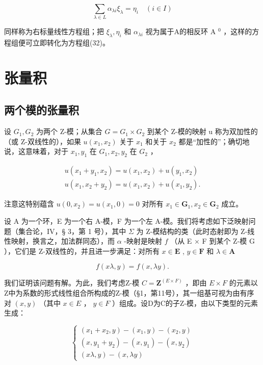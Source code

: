\[
\sum_ {\lambda \in L} \alpha_ {\lambda i} \xi_ {\lambda} = \eta_ {i} \quad (i \in I)\tag{33}
\]

同样称为右标量线性方程组；把 \(\xi_{\lambda}, \eta_{i}\) 和 \(\alpha_{\lambda i}\) 视为属于A的相反环 A \(^{0}\) ，这样的方程组便可立即转化为方程组(32)。

\section{张量积}

\subsection{两个模的张量积}

设 \(G_{1}, G_{2}\) 为两个 Z-模；从集合 \(G = G_{1} \times G_{2}\) 到某个 Z-模的映射 u 称为双加性的（或 Z-双线性的），如果 \(u(x_{1}, x_{2})\) 关于 \(x_{1}\) 和关于 \(x_{2}\) 都是“加性的”；确切地说，这意味着，对于 \(x_{1}, y_{1}\) 在 \(G_{1}, x_{2}, y_{2}\) 在 \(G_{2}\) ，

\[
\begin{array}{l} u (x _ {1} + y _ {1}, x _ {2}) = u (x _ {1}, x _ {2}) + u (y _ {1}, x _ {2}) \\ u (x _ {1}, x _ {2} + y _ {2}) = u (x _ {1}, x _ {2}) + u (x _ {1}, y _ {2}). \end{array}
\]

注意这特别蕴含 \(u(0, x_2) = u(x_1, 0) = 0\) 对所有 \(x_1 \in \mathbf{G}_1, x_2 \in \mathbf{G}_2\) 成立。

设 A 为一个环，E 为一个右 A-模，F 为一个左 A-模。我们将考虑如下泛映射问题（集合论，IV，§ 3，第 1 号），其中 \(\Sigma\) 为 Z-模结构的类（此时态射即为 Z-线性映射，换言之，加法群同态），而 \(\alpha\) -映射是映射 \(f\) （从 E \(\times\) F 到某个 Z-模 G ），它们是 Z-双线性的，并且进一步满足：对所有 \(x \in \mathbf{E}\) , \(y \in \mathbf{F}\) 和 \(\lambda \in \mathbf{A}\)

\[
f (x \lambda , y) = f (x, \lambda y).\tag{1}
\]

我们证明该问题有解。为此，我们考虑Z-模 \(C = \mathbf{Z}^{(E \times F)}\) ，即由 \(E \times F\) 的元素以Z中为系数的形式线性组合所构成的Z-模（§1，第11号），其一组基可视为由有序对 \((x, y)\) （其中 \(x \in E\) ， \(y \in F\) ）组成。设D为C的子Z-模，由以下类型的元素生成：

\[
\left\{ \begin{array}{l} (x _ {1} + x _ {2}, y) - (x _ {1}, y) - (x _ {2}, y) \\ (x, y _ {1} + y _ {2}) - (x, y _ {1}) - (x, y _ {2}) \\ (x \lambda , y) - (x, \lambda y) \end{array} \right.\tag{2}
\]

